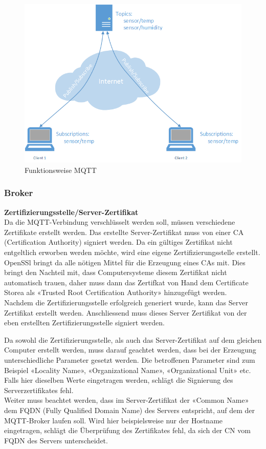 \begin{figure}[h!]
	\centering
		\includegraphics[scale=0.6]{report/img/mqttFunktionsweise}
	\caption{Funktionsweise MQTT}
	\label{fig:deploymentAzure}
\end{figure}

\subsubsection{Broker}

\textbf{Zertifizierungsstelle/Server-Zertifikat} \\
Da die MQTT-Verbindung verschlüsselt werden soll, müssen verschiedene Zertifikate erstellt werden. Das erstellte Server-Zertifikat muss von einer CA (Certification Authority) signiert werden. Da ein gültiges Zertifikat nicht entgeltlich erworben werden möchte, wird eine eigene Zertifizierungsstelle erstellt. OpenSSl bringt da alle nötigen Mittel für die Erzeugung eines CAs mit. Dies bringt den Nachteil mit, dass Computersysteme diesem Zertifikat nicht automatisch trauen, daher muss dann das Zertifkat von Hand dem Certificate Storea als «Trusted Root Certification Authority» hinzugefügt werden. \\

Nachdem die Zertifizierungsstelle erfolgreich generiert wurde, kann das Server Zertifikat erstellt werden. Anschliessend muss dieses Server Zertifikat von der eben erstellten Zertifizierungsstelle signiert werden.

Da sowohl die Zertifizierungsstelle, als auch das Server-Zertifikat auf dem gleichen Computer erstellt werden, muss darauf geachtet werden, dass bei der Erzeugung unterschiedliche Parameter gesetzt werden. Die betroffenen Parameter sind zum Beispiel «Locality Name», «Organizational Name», «Organizational Unit» etc. Falls hier dieselben Werte eingetragen werden, schlägt die Signierung des Serverzertifikates fehl. \\
Weiter muss beachtet werden, dass im Server-Zertifikat der «Common Name» dem FQDN (Fully Qualified Domain Name) des Servers entspricht, auf dem der MQTT-Broker laufen soll. Wird hier beispielsweise nur der Hostname eingetragen, schlägt die Überprüfung des Zertifikates fehl, da sich der CN vom FQDN des Servers unterscheidet.

